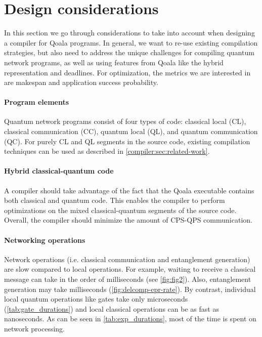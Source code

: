 \section{Design considerations}
In this section we go through considerations to take into account when designing a compiler for Qoala programs.
In general, we want to re-use existing compilation strategies, but also need to address the unique challenges for compiling quantum network programs, as well as using features from Qoala like the hybrid representation and deadlines.
For optimization, the metrics we are interested in are makespan and application success probability. 

\paragraph{Program elements}
Quantum network programs consist of four types of code: classical local (CL), classical communication (CC), quantum local (QL), and quantum communication (QC).
For purely CL and QL segments in the source code, existing compilation techniques can be used as described in \cref{compiler:sec:related-work}.

\paragraph{Hybrid classical-quantum code}
A compiler should take advantage of the fact that the Qoala executable contains both classical and quantum code.
This enables the compiler to perform optimizations on the mixed classical-quantum segments of the source code.
Overall, the compiler should minimize the amount of CPS-QPS communication.


\paragraph{Networking operations}
Network operations (i.e. classical communication and entanglement generation) are slow compared to local operations.
For example, waiting to receive a classical message can take in the order of milliseconds (see \cref{fig:fig2}).
Also, entanglement generation may take milliseconds (\cref{fig:delcomp-epr-rate}).
By contrast, individual local quantum operations like gates take only microseconds (\cref{tab:gate_durations}) and local classical operations can be as fast as nanoseconds.
As can be seen in \cref{tab:exp_durations}, most of the time is spent on network processing.

